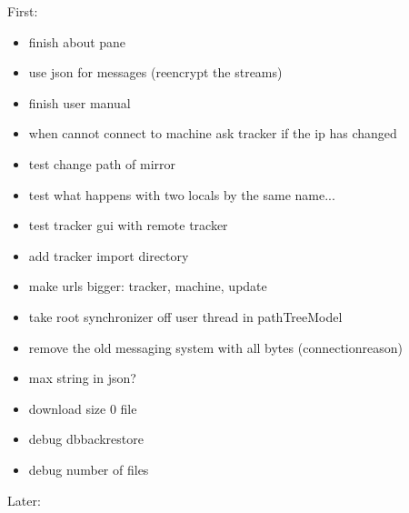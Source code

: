 \documentclass{article}
\begin{document}
First:
\begin{itemize}
\item finish about pane
\item use json for messages (reencrypt the streams)
\item finish user manual
\item when cannot connect to machine ask tracker if the ip has changed
\item test change path of mirror
\item test what happens with two locals by the same name...
\item test tracker gui with remote tracker
\item add tracker import directory
\item make urls bigger: tracker, machine, update
\item take root synchronizer off user thread in pathTreeModel
\item remove the old messaging system with all bytes (connectionreason)
\item max string in json?
\item download size 0 file
\item debug dbbackrestore
\item debug number of files
\end{itemize}
Later:
\end{document}
